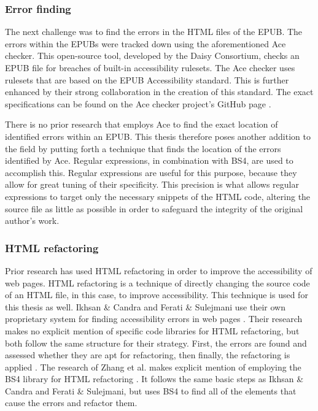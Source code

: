 \subsubsection{Error finding}
The next challenge was to find the errors in the HTML files of the EPUB. The errors within the EPUBs were tracked down using the aforementioned Ace checker. This open-source tool, developed by the Daisy Consortium, checks an EPUB file for breaches of built-in accessibility rulesets. The Ace checker uses rulesets that are based on the EPUB Accessibility standard. This is further enhanced by their strong collaboration in the creation of this standard. The exact specifications can be found on the Ace checker project's GitHub page \cite{AceRules}. 

There is no prior research that employs Ace to find the exact location of identified errors within an EPUB. This thesis therefore poses another addition to the field by putting forth a technique that finds the location of the errors identified by Ace. Regular expressions, in combination with BS4, are used to accomplish this. Regular expressions are useful for this purpose, because they allow for great tuning of their specificity. This precision is what allows regular expressions to target only the necessary snippets of the HTML code, altering the source file as little as possible in order to safeguard the integrity of the original author’s work.


\subsubsection{HTML refactoring}
Prior research has used HTML refactoring in order to improve the accessibility of web pages\cite{Ikhsan2018,Ferati2016,Zhang2024}. HTML refactoring is a technique of directly changing the source code of an HTML file, in this case, to improve accessibility. This technique is used for this thesis as well. Ikhsan \& Candra and Ferati \& Sulejmani use their own proprietary system for finding accessibility errors in web pages \cite{Ikhsan2018, Ferati2016}. Their research makes no explicit mention of specific code libraries for HTML refactoring, but both follow the same structure for their strategy. First, the errors are found and assessed whether they are apt for refactoring, then finally, the refactoring is applied \cite{Ikhsan2018, Ferati2016}. The research of Zhang et al. makes explicit mention of employing the BS4 library for HTML refactoring \cite{Zhang2024}. It follows the same basic steps as Ikhsan \& Candra and Ferati \& Sulejmani, but uses BS4 to find all of the elements that cause the errors and refactor them.

